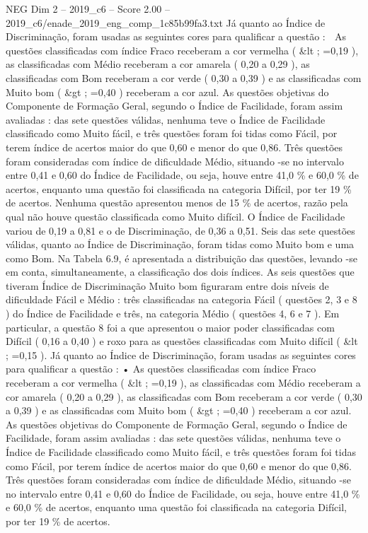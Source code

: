 \begin{textsample}{NEG Dim 2 – 2019\_c6 – Score 2.00 – 2019\_c6/enade\_2019\_eng\_comp\_1c85b99fa3.txt}
Já quanto ao Índice de Discriminação, foram usadas as seguintes cores para qualificar a questão :  As questões classificadas com índice Fraco receberam a cor vermelha ( \&lt ; =0,19 ), as classificadas com Médio receberam a cor amarela ( 0,20 a 0,29 ), as classificadas com Bom receberam a cor verde ( 0,30 a 0,39 ) e as classificadas com Muito bom ( \&gt ; =0,40 ) receberam a cor azul.
As questões objetivas do Componente de Formação Geral, segundo o Índice de Facilidade, foram assim avaliadas : das sete questões válidas, nenhuma teve o Índice de Facilidade classificado como Muito fácil, e três questões foram foi tidas como Fácil, por terem índice de acertos maior do que 0,60 e menor do que 0,86.
Três questões foram consideradas com índice de dificuldade Médio, situando -se no intervalo entre 0,41 e 0,60 do Índice de Facilidade, ou seja, houve entre 41,0 \% e 60,0 \% de acertos, enquanto uma questão foi classificada na categoria Difícil, por ter 19 \% de acertos.
Nenhuma questão apresentou menos de 15 \% de acertos, razão pela qual não houve questão classificada como Muito difícil.
O Índice de Facilidade variou de 0,19 a 0,81 e o de Discriminação, de 0,36 a 0,51.
Seis das sete questões válidas, quanto ao Índice de Discriminação, foram tidas como Muito bom e uma como Bom.
Na Tabela 6.9, é apresentada a distribuição das questões, levando -se em conta, simultaneamente, a classificação dos dois índices.
As seis questões que tiveram Índice de Discriminação Muito bom figuraram entre dois níveis de dificuldade Fácil e Médio : três classificadas na categoria Fácil ( questões 2, 3 e 8 ) do Índice de Facilidade e três, na categoria Médio ( questões 4, 6 e 7 ).
Em particular, a questão 8 foi a que apresentou o maior poder classificadas com Difícil ( 0,16 a 0,40 ) e roxo para as questões classificadas com Muito difícil ( \&lt ; =0,15 ).
Já quanto ao Índice de Discriminação, foram usadas as seguintes cores para qualificar a questão : • As questões classificadas com índice Fraco receberam a cor vermelha ( \&lt ; =0,19 ), as classificadas com Médio receberam a cor amarela ( 0,20 a 0,29 ), as classificadas com Bom receberam a cor verde ( 0,30 a 0,39 ) e as classificadas com Muito bom ( \&gt ; =0,40 ) receberam a cor azul.
As questões objetivas do Componente de Formação Geral, segundo o Índice de Facilidade, foram assim avaliadas : das sete questões válidas, nenhuma teve o Índice de Facilidade classificado como Muito fácil, e três questões foram foi tidas como Fácil, por terem índice de acertos maior do que 0,60 e menor do que 0,86.
Três questões foram consideradas com índice de dificuldade Médio, situando -se no intervalo entre 0,41 e 0,60 do Índice de Facilidade, ou seja, houve entre 41,0 \% e 60,0 \% de acertos, enquanto uma questão foi classificada na categoria Difícil, por ter 19 \% de acertos.

\end{textsample}
